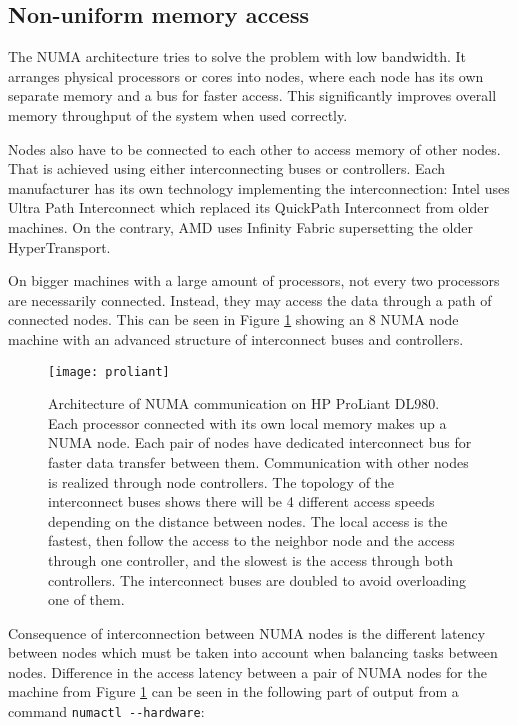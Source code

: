 \subsection{Non-uniform memory access}
The NUMA architecture tries to solve the problem with low bandwidth.
It arranges physical processors or cores into nodes, where each node has its
own separate memory and a bus for faster access. This significantly improves
overall memory throughput of the system when used correctly.

Nodes also have to be connected to each other to access memory of other
nodes. That is achieved using either interconnecting buses or controllers. Each
manufacturer has its own technology implementing the interconnection: Intel uses
Ultra Path Interconnect which replaced its QuickPath Interconnect from older
machines. On the contrary, AMD uses Infinity Fabric supersetting the older
HyperTransport.

On bigger machines with a large amount of processors, not every two processors
are necessarily connected. Instead, they may access the data through a path
of connected nodes. This can be seen in Figure \ref{fig:proliant} showing an 8
NUMA node machine with an advanced structure of interconnect buses and
controllers.

\begin{figure}
  \centering
  \texttt{[image: proliant]}
  \caption{Architecture of NUMA communication on HP ProLiant
    DL980\;\cite{proliant}. Each processor connected with its own local memory
    makes up a NUMA node. Each pair of nodes have dedicated interconnect bus for
    faster data transfer between them. Communication with other nodes is
    realized through node controllers. The topology of the interconnect buses
    shows there will be 4 different access speeds depending on the distance
    between nodes. The local access is the fastest, then follow the access to
    the neighbor node and the access through one controller, and the slowest is the
    access through both controllers. The interconnect buses are doubled to avoid
    overloading one of them.}
  \label{fig:proliant}
\end{figure}

Consequence of interconnection between NUMA nodes is the different latency
between nodes which must be taken into account when balancing tasks between
nodes. Difference in the access latency between a pair of NUMA nodes for the
machine from Figure \ref{fig:proliant} can be seen in the following part of
output from a command \verb|numactl --hardware|:

